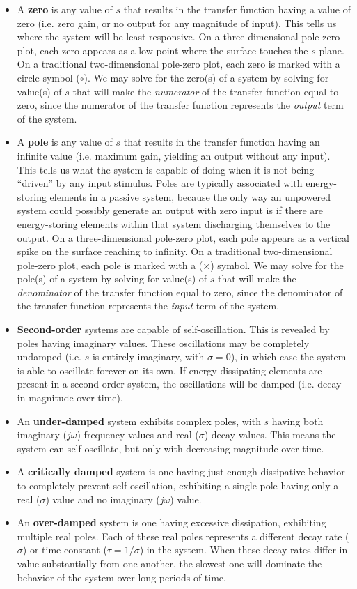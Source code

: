 \begin{itemize}
\vskip 10pt
\item A \textbf{zero} is any value of $s$ that results in the transfer function having a value of zero (i.e. zero gain, or no output for any magnitude of input).  This tells us where the system will be least responsive.  On a three-dimensional pole-zero plot, each zero appears as a low point where the surface touches the $s$ plane.  On a traditional two-dimensional pole-zero plot, each zero is marked with a circle symbol ($\circ$).  We may solve for the zero(s) of a system by solving for value(s) of $s$ that will make the \textit{numerator} of the transfer function equal to zero, since the numerator of the transfer function represents the \textit{output} term of the system.
\vskip 10pt
\item A \textbf{pole} is any value of $s$ that results in the transfer function having an infinite value (i.e. maximum gain, yielding an output without any input).  This tells us what the system is capable of doing when it is not being ``driven'' by any input stimulus.  Poles are typically associated with energy-storing elements in a passive system, because the only way an unpowered system could possibly generate an output with zero input is if there are energy-storing elements within that system discharging themselves to the output.  On a three-dimensional pole-zero plot, each pole appears as a vertical spike on the surface reaching to infinity.  On a traditional two-dimensional pole-zero plot, each pole is marked with a ($\times$) symbol.  We may solve for the pole(s) of a system by solving for value(s) of $s$ that will make the \textit{denominator} of the transfer function equal to zero, since the denominator of the transfer function represents the \textit{input} term of the system.
\vskip 10pt
\item \textbf{Second-order} systems are capable of self-oscillation.  This is revealed by poles having imaginary values.  These oscillations may be completely undamped (i.e. $s$ is entirely imaginary, with $\sigma = 0$), in which case the system is able to oscillate forever on its own.  If energy-dissipating elements are present in a second-order system, the oscillations will be damped (i.e. decay in magnitude over time).  
\vskip 10pt
\item An \textbf{under-damped} system exhibits complex poles, with $s$ having both imaginary ($j \omega$) frequency values and real ($\sigma$) decay values.  This means the system can self-oscillate, but only with decreasing magnitude over time.
\vskip 10pt
\item A \textbf{critically damped} system is one having just enough dissipative behavior to completely prevent self-oscillation, exhibiting a single pole having only a real ($\sigma$) value and no imaginary ($j \omega$) value.  
\vskip 10pt
\item An \textbf{over-damped} system is one having excessive dissipation, exhibiting multiple real poles.  Each of these real poles represents a different decay rate ($\sigma$) or time constant ($\tau = 1 / \sigma$) in the system.  When these decay rates differ in value substantially from one another, the slowest one will dominate the behavior of the system over long periods of time.
\end{itemize}
